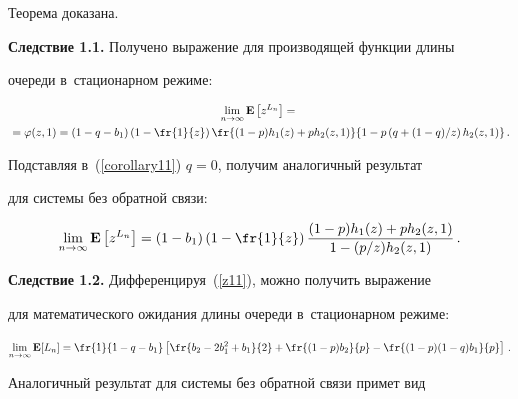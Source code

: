 Теорема доказана.



\smallskip



\noindent

\textbf{Следствие 1.1.} Получено выражение для производящей функции длины

очереди в~стационарном режиме:

\begin{multline}

\lim\limits_{n\to\infty}\mathbf{E}\left[z^{L_n}\right]={}\\

{}=

\varphi(z,1)=\left(1-q-b_1\right)\left(1-\fr{1}{z}\right)

\fr{(1-p)h_1(z)+ph_2(z,1)}{1-p\left(q+(1-q)/z\right)h_2(z,1)}\,.

\label{corollary11}

\end{multline}

Подставляя в~(\ref{corollary11}) $q=0$, получим аналогичный результат

для системы без обратной связи:

\begin{equation}

\lim\limits_{n\to\infty}\mathbf{E}\left[z^{L_n}\right]=

\left(1-b_1\right)\left(1-\fr{1}{z}\right)\frac{(1-p)h_1(z)+ph_2(z,1)}

{1-(p/z)h_2(z,1)}\,.

\label{corollary12}

\end{equation}



\noindent

\textbf{Следствие 1.2.} Дифференцируя~(\ref{z11}), можно получить выражение

для математического ожидания длины очереди в~стационарном режиме:

\begin{equation}

\lim_{n\to\infty}\mathbf{E}[L_n]=\fr{1}{1-q-b_1}\left[

\fr{b_2-2b_1^2+b_1}{2}+\fr{(1-p)b_2}{p}-\fr{(1-p)(1-q)b_1}{p}\right]\,.

\label{corollary21}

\end{equation}

Аналогичный результат для системы без обратной связи примет вид

